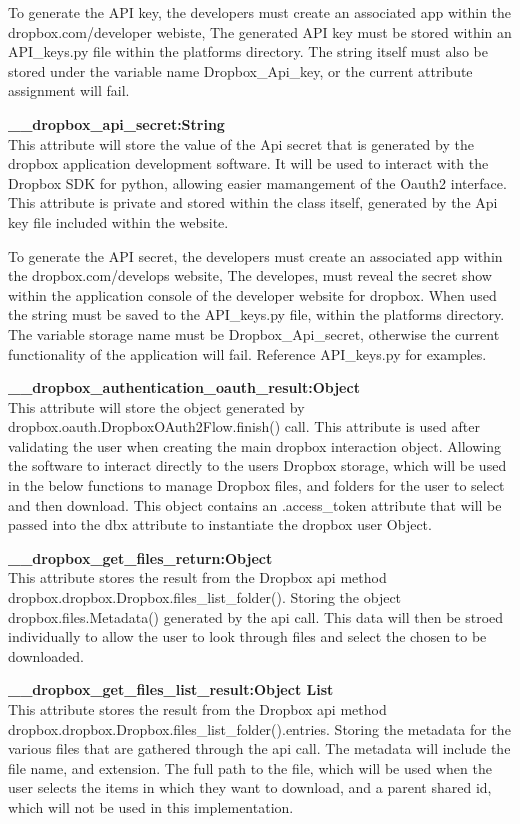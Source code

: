     To generate the API key, the developers must create an associated app within the dropbox.com/developer webiste,
    The generated API key must be stored within an API_keys.py file within the platforms directory. The string itself
    must also be stored under the variable name Dropbox_Api_key, or the current attribute assignment will fail. 

\textbf{\_\_dropbox\_api\_secret:String} \\
    This attribute will store the value of the Api secret that is generated by the dropbox application development
    software. It will be used to interact with the Dropbox SDK for python, allowing easier mamangement of the Oauth2
    interface. This attribute is private and stored within the class itself, generated by the Api key file included 
    within the website.

    To generate the API secret, the developers must create an associated app within the dropbox.com/develops website,
    The developes, must reveal the secret show within the application console of the developer website for dropbox. When 
    used the string must be saved to the API_keys.py file, within the platforms directory. The variable storage name must
    be Dropbox_Api_secret, otherwise the current functionality of the application will fail. Reference API_keys.py for 
    examples. 

\textbf{\_\_dropbox\_authentication\_oauth\_result:Object} \\
    This attribute will store the object generated by dropbox.oauth.DropboxOAuth2Flow.finish() call. This attribute is used after validating
    the user when creating the main dropbox interaction object. Allowing the software to interact directly to the users Dropbox storage, 
    which will be used in the below functions to manage Dropbox files, and folders for the user to select and then download. This object contains 
    an .access_token attribute that will be passed into the dbx attribute to instantiate the dropbox user Object.

\textbf{\_\_dropbox\_get\_files\_return:Object} \\
    This attribute stores the result from the Dropbox api method dropbox.dropbox.Dropbox.files\_list\_folder(). Storing the object 
    dropbox.files.Metadata() generated by the api call. This data will then be stroed individually to allow the user to look through 
    files and select the chosen to be downloaded.

\textbf{\_\_dropbox\_get\_files\_list\_result:Object List} \\
    This attribute stores the result from the Dropbox api method dropbox.dropbox.Dropbox.files_list_folder().entries. Storing the metadata for 
    the various files that are gathered through the api call. The metadata will include the file name, and extension. The full path to the file, 
    which will be used when the user selects the items in which they want to download, and a parent shared id, which will not be used in this 
    implementation.

